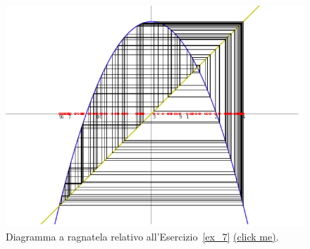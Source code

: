 \documentclass[italian,a4paper]{scrartcl}
\newcommand{\online}[1]{\href{http://paolini.github.io/recurrence/?#1}{\underline{(click
      me)}}}
\begin{document}
\begin{figure}
  \begin{center}
    \includegraphics[width=\textwidth]{fig_ex_7.png}
  \end{center}
  \caption{Diagramma a ragnatela relativo
    all'Esercizio~\ref{ex_7} \online{expr=2-x*x&x=-1.105&scale=100}.}
  \label{fig_ex_7}
\end{figure}
\end{document}
